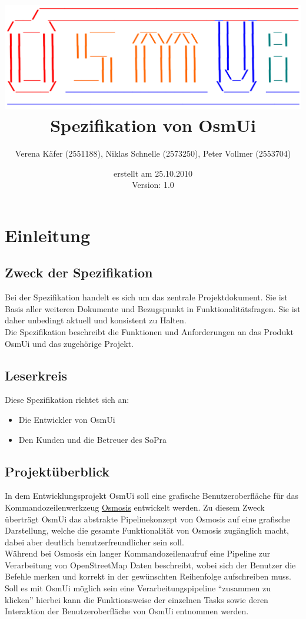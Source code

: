 \documentclass[a4paper,10pt]{scrartcl}
\author{Verena Käfer (2551188), Niklas Schnelle (2573250), Peter Vollmer (2553704)}
\date{erstellt am 25.10.2010\\
Version: 1.0}
\title{\includegraphics[width=15cm]{../projektplan/Logo_Osmui.png} \\ 
Spezifikation von OsmUi}
\begin{document}
\maketitle
\newpage
\tableofcontents
\newpage

\section{Einleitung}
\subsection{Zweck der Spezifikation}
Bei der Spezifikation handelt es sich um das zentrale Projektdokument. Sie ist Basis aller weiteren Dokumente und
Bezugspunkt in Funktionalitätsfragen. Sie ist daher unbedingt aktuell und konsistent zu Halten.\\
Die Spezifikation beschreibt die Funktionen und Anforderungen an das Produkt OsmUi und das zugehörige Projekt.
\subsection{Leserkreis}
Diese Spezifikation richtet sich an:
\begin{itemize}
 \item Die Entwickler von OsmUi
 \item Den Kunden und die Betreuer des SoPra
\end{itemize}

\subsection{Projektüberblick}
In dem Entwicklungsprojekt OsmUi soll eine grafische Benutzeroberfläche für das Kommandozeilenwerkzeug \href{http://wiki.openstreetmap.org/wiki/Osmosis}{Osmosis}
entwickelt werden. Zu diesem Zweck überträgt OsmUi das abstrakte Pipelinekonzept von Osmosis auf eine grafische Darstellung, welche die gesamte
Funktionalität von Osmosis zugänglich macht, dabei aber deutlich benutzerfreundlicher sein soll.\\
Während bei Osmosis ein langer Kommandozeilenaufruf eine Pipeline zur Verarbeitung von OpenStreetMap Daten beschreibt, wobei sich der Benutzer die Befehle merken
und korrekt in der gewünschten Reihenfolge aufschreiben muss.\\
Soll es mit OsmUi möglich sein eine Verarbeitungspipeline ``zusammen zu klicken'' hierbei kann die Funktionsweise der einzelnen Tasks sowie deren Interaktion
der Benutzeroberfläche von OsmUi entnommen werden.
\end{document}
